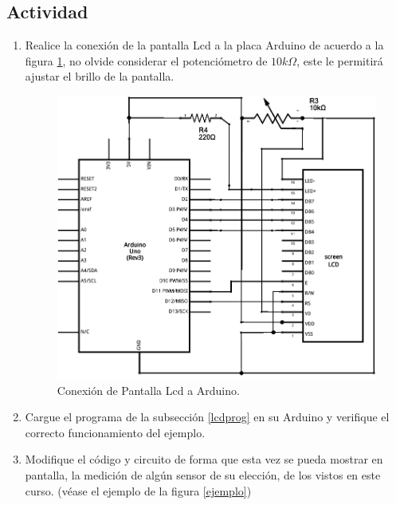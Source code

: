 \documentclass[letterpaper, 10pt]{report}
\begin{document}
\subsection{Actividad}

\begin{enumerate}
\item Realice la conexión de la pantalla Lcd a la placa Arduino de acuerdo a la figura \ref{circuitoLCD}, no olvide considerar el potenciómetro de $10k\Omega$, este le permitirá ajustar el brillo de la pantalla.

\begin{figure}[h]
\centering
\includegraphics[scale=0.9]{circuitoLCD.png}
\caption{Conexión de Pantalla Lcd a Arduino.\label{circuitoLCD}}
\end{figure}

\item Cargue el programa de la subsección \ref{lcdprog} en su Arduino y verifique el correcto funcionamiento del ejemplo.

\item Modifique el código y circuito de forma que esta vez se pueda mostrar en pantalla, la medición de algún sensor de su elección, de los vistos en este curso. (véase el ejemplo de la figura \ref{ejemplo})


\end{enumerate}
\end{document}
